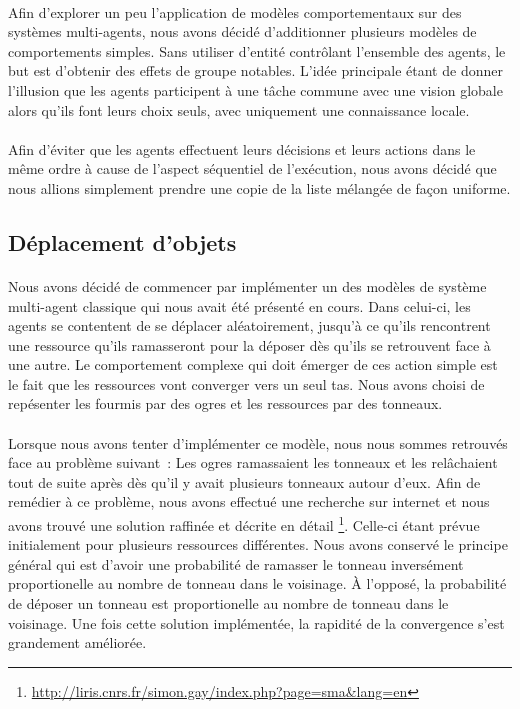 \paragraph{}
Afin d'explorer un peu l'application de modèles comportementaux sur des
systèmes multi-agents, nous avons décidé d'additionner plusieurs modèles
de comportements simples. Sans utiliser d'entité contrôlant l'ensemble des
agents, le but est d'obtenir des effets de groupe notables. L'idée principale
étant de donner l'illusion que les agents participent à une tâche commune
avec une vision globale alors qu'ils font leurs choix seuls, avec uniquement
une connaissance locale.

\paragraph{}
Afin d'éviter que les agents effectuent leurs décisions et leurs actions dans
le même ordre à cause de l'aspect séquentiel de l'exécution, nous avons décidé
que nous allions simplement prendre une copie de la liste mélangée de façon
uniforme.

\subsection{Déplacement d'objets}
\paragraph{}
Nous avons décidé de commencer par implémenter un des modèles de système
multi-agent classique qui nous avait été présenté en cours. Dans celui-ci, les
agents se contentent de se déplacer aléatoirement, jusqu'à ce qu'ils
rencontrent une ressource qu'ils ramasseront pour la déposer dès qu'ils se
retrouvent face à une autre. Le comportement complexe qui doit émerger de ces
action simple est le fait que les ressources vont converger vers un seul tas.
Nous avons choisi de repésenter les fourmis par des ogres et les ressources par
des tonneaux.

\paragraph{}
Lorsque nous avons tenter d'implémenter ce modèle, nous nous sommes retrouvés
face au problème suivant~: Les ogres ramassaient les tonneaux et les
relâchaient tout de suite après dès qu'il y avait plusieurs tonneaux autour
d'eux. Afin de remédier à ce problème, nous avons effectué une recherche sur
internet et nous avons trouvé une solution raffinée et décrite en détail
\footnote{\url{http://liris.cnrs.fr/simon.gay/index.php?page=sma&lang=en}}.
Celle-ci étant prévue initialement pour plusieurs ressources différentes. Nous
avons conservé le principe général qui est d'avoir une probabilité de ramasser
le tonneau inversément proportionelle au nombre de tonneau dans le voisinage. À
l'opposé, la probabilité de déposer un tonneau est proportionelle au nombre
de tonneau dans le voisinage. Une fois cette solution implémentée, la rapidité
de la convergence s'est grandement améliorée.

